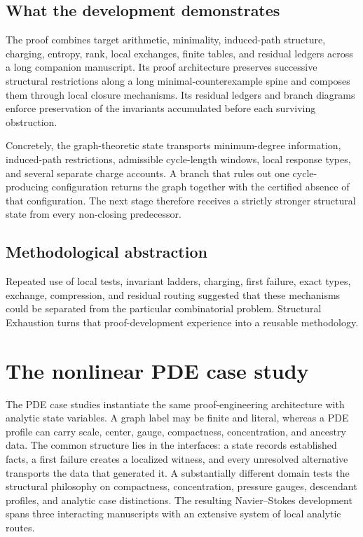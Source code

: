 \documentclass[11pt]{article}
\begin{document}
\subsection{What the development demonstrates}
The proof combines target arithmetic, minimality, induced-path structure, charging, entropy, rank, local exchanges, finite tables, and residual ledgers across a long companion manuscript.
Its proof architecture preserves successive structural restrictions along a long minimal-counterexample spine and composes them through local closure mechanisms.
Its residual ledgers and branch diagrams enforce preservation of the invariants accumulated before each surviving obstruction.

Concretely, the graph-theoretic state transports minimum-degree information,
induced-path restrictions, admissible cycle-length windows, local response
types, and several separate charge accounts. A branch that rules out one
cycle-producing configuration returns the graph together with the certified
absence of that configuration. The next stage therefore receives a strictly
stronger structural state from every non-closing predecessor.
\subsection{Methodological abstraction}
Repeated use of local tests, invariant ladders, charging, first failure, exact types, exchange, compression, and residual routing suggested that these mechanisms could be separated from the particular combinatorial problem.
Structural Exhaustion turns that proof-development experience into a reusable methodology.
\section{The nonlinear PDE case study}
The PDE case studies instantiate the same proof-engineering architecture with
analytic state variables. A graph label may be finite and literal, whereas a
PDE profile can carry scale, center, gauge, compactness, concentration, and
ancestry data. The common structure lies in the interfaces: a state records
established facts, a first failure creates a localized witness, and every
unresolved alternative transports the data that generated it.
A substantially different domain tests the structural philosophy on compactness, concentration, pressure gauges, descendant profiles, and analytic case distinctions.
The resulting Navier–Stokes development spans three interacting manuscripts with an extensive system of local analytic routes.
\end{document}
